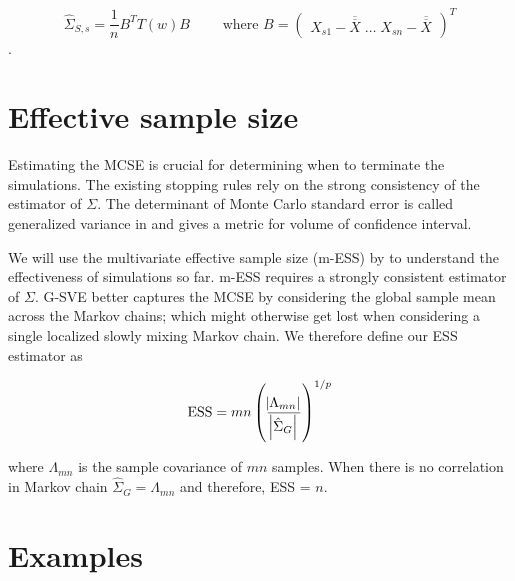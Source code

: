 \documentclass[11pt]{article}
\theoremstyle{remark}
\begin{document}
\[
\hat{\Sigma}_{S,s} = \dfrac{1}{n}B^T T(w) B \qquad \textrm{ where } B = 
\begin{pmatrix}
    X_{s1} - \overline{\overline{X}} \; \dots \; X_{sn} - \overline{\overline{X}}\end{pmatrix}^T
\].


\section{Effective sample size} \label{sec:ess}

Estimating the MCSE is crucial for determining when to terminate the simulations. The existing stopping rules rely on the strong consistency of the estimator of $\Sigma$. The determinant of Monte Carlo standard error is called generalized variance in  \cite{wilks1932certain} and gives a metric for volume of confidence interval. 

We will use the multivariate effective sample size (m-ESS) by \cite{vats2019multivariate} to understand the effectiveness of simulations so far. m-ESS requires a strongly consistent estimator of $\Sigma$. G-SVE better captures the MCSE by considering the global sample mean across the Markov chains; which might otherwise get lost when considering a single localized slowly mixing Markov chain. We therefore define our ESS estimator as

\[
\text{ESS} = mn\left(\dfrac{\abs{\Lambda_{mn}}}{\abs{\hat{\Sigma}_{G}}}\right)^{1/p}
\]

where $\Lambda_{mn}$ is the sample covariance of $mn$ samples. When there is no correlation in Markov chain $\hat{\Sigma}_{G} = \Lambda_{mn}$ and therefore, ESS = $n$. 

\section{Examples} \label{sec:examples}
\end{document}
